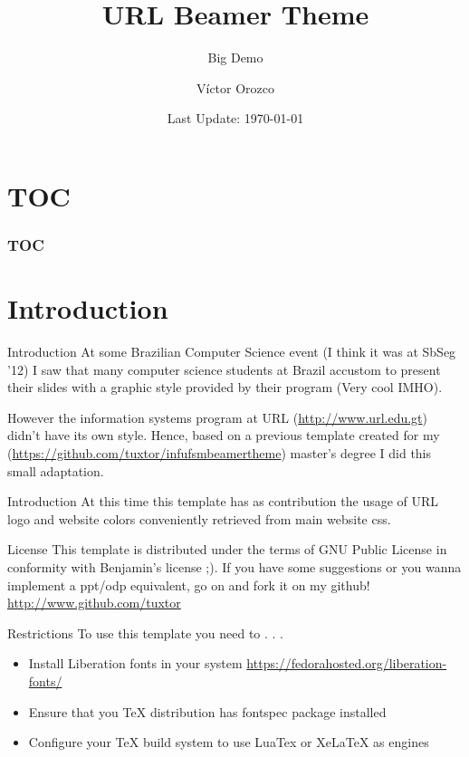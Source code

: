 \documentclass{beamer}
\title{URL Beamer Theme}
\subtitle{Big Demo}
\date{Last Update: \today}
\author{Víctor Orozco}
\institute{{\Medium Ingeniería} URL}
\begin{document}
\maketitle

\section*{TOC}
\begin{frame}
	\frametitle{TOC}
	\tableofcontents[hideallsubsections]
\end{frame}

\section{Introduction}

\begin{frame}{Introduction}
	At some Brazilian Computer Science event (I think it was at SbSeg '12) I saw that many computer science students at Brazil accustom to present their slides with a graphic style provided by their program (Very cool IMHO).
	
	However the information systems program at URL (\url{http://www.url.edu.gt}) didn't have its own style. Hence, based on a previous template created for my (\url{https://github.com/tuxtor/infufsmbeamertheme}) master's degree I did this small adaptation.
\end{frame}

\begin{frame}{Introduction}
	At this time this template has as contribution the usage of URL logo and website colors conveniently retrieved from main website css.
\end{frame}

\begin{frame}{License}
	This template is distributed under the terms of GNU Public License in conformity with Benjamin's license ;). If you have some suggestions or you wanna implement a ppt/odp equivalent, go on and fork it on my github! \url{http://www.github.com/tuxtor}
\end{frame}

\begin{frame}{Restrictions}
	To use this template you need to . . .
	\begin{itemize}
		\item Install Liberation fonts in your system \url{https://fedorahosted.org/liberation-fonts/}
		\item Ensure that you TeX distribution has fontspec package installed
		\item Configure your TeX build system to use LuaTex or XeLaTeX as engines
	\end{itemize}
\end{frame}
\end{document}
